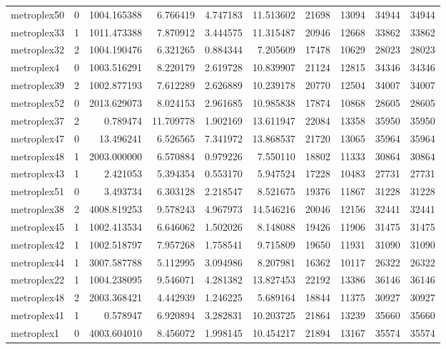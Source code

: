 \begin{longtable}{|l|r|r|r|r|r|r|r|r|r|}
metroplex50 & 0 & 1004.165388 & 6.766419 & 4.747183 & 11.513602 & 21698 & 13094 & 34944 & 34944 \\
metroplex33 & 1 & 1011.473388 & 7.870912 & 3.444575 & 11.315487 & 20946 & 12668 & 33862 & 33862 \\
metroplex32 & 2 & 1004.190476 & 6.321265 & 0.884344 & 7.205609 & 17478 & 10629 & 28023 & 28023 \\
metroplex4 & 0 & 1003.516291 & 8.220179 & 2.619728 & 10.839907 & 21124 & 12815 & 34346 & 34346 \\
metroplex39 & 2 & 1002.877193 & 7.612289 & 2.626889 & 10.239178 & 20770 & 12504 & 34007 & 34007 \\
metroplex52 & 0 & 2013.629073 & 8.024153 & 2.961685 & 10.985838 & 17874 & 10868 & 28605 & 28605 \\
metroplex37 & 2 & 0.789474 & 11.709778 & 1.902169 & 13.611947 & 22084 & 13358 & 35950 & 35950 \\
metroplex47 & 0 & 13.496241 & 6.526565 & 7.341972 & 13.868537 & 21720 & 13065 & 35964 & 35964 \\
metroplex48 & 1 & 2003.000000 & 6.570884 & 0.979226 & 7.550110 & 18802 & 11333 & 30864 & 30864 \\
metroplex43 & 1 & 2.421053 & 5.394354 & 0.553170 & 5.947524 & 17228 & 10483 & 27731 & 27731 \\
metroplex51 & 0 & 3.493734 & 6.303128 & 2.218547 & 8.521675 & 19376 & 11867 & 31228 & 31228 \\
metroplex38 & 2 & 4008.819253 & 9.578243 & 4.967973 & 14.546216 & 20046 & 12156 & 32441 & 32441 \\
metroplex45 & 1 & 1002.413534 & 6.646062 & 1.502026 & 8.148088 & 19426 & 11906 & 31475 & 31475 \\
metroplex42 & 1 & 1002.518797 & 7.957268 & 1.758541 & 9.715809 & 19650 & 11931 & 31090 & 31090 \\
metroplex44 & 1 & 3007.587788 & 5.112995 & 3.094986 & 8.207981 & 16362 & 10117 & 26322 & 26322 \\
metroplex22 & 1 & 1004.238095 & 9.546071 & 4.281382 & 13.827453 & 22192 & 13386 & 36146 & 36146 \\
metroplex48 & 2 & 2003.368421 & 4.442939 & 1.246225 & 5.689164 & 18844 & 11375 & 30927 & 30927 \\
metroplex41 & 1 & 0.578947 & 6.920894 & 3.282831 & 10.203725 & 21864 & 13239 & 35660 & 35660 \\
metroplex1 & 0 & 4003.604010 & 8.456072 & 1.998145 & 10.454217 & 21894 & 13167 & 35574 & 35574 \\

\end{longtable}
